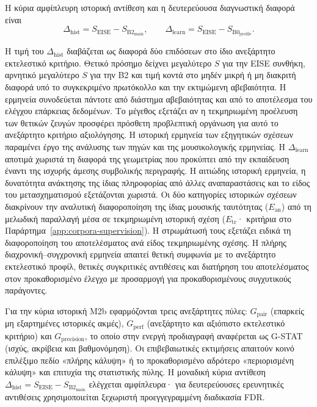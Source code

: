 \documentclass[11pt,a4paper]{article}
\begin{document}
Η κύρια αμφίπλευρη ιστορική αντίθεση και η δευτερεύουσα διαγνωστική διαφορά είναι
\[
\Delta_{\mathrm{hist}}=S_{\mathrm{EISE}}-S_{\mathrm{B2}_{\mathrm{main}}},
\qquad
\Delta_{\mathrm{learn}}=S_{\mathrm{EISE}}-S_{\mathrm{B0}_{\mathrm{profile}}}.
\]

Η τιμή του $\Delta_{\mathrm{hist}}$ διαβάζεται ως διαφορά δύο επιδόσεων στο ίδιο ανεξάρτητο εκτελεστικό κριτήριο. Θετικό πρόσημο δείχνει μεγαλύτερο $S$ για την EISE συνθήκη, αρνητικό μεγαλύτερο $S$ για την B2 και τιμή κοντά στο μηδέν μικρή ή μη διακριτή διαφορά υπό το συγκεκριμένο πρωτόκολλο και την εκτιμώμενη αβεβαιότητα. Η ερμηνεία συνοδεύεται πάντοτε από διάστημα αβεβαιότητας και από το αποτέλεσμα του ελέγχου επάρκειας δεδομένων. Το μέγεθος εξετάζει αν η τεκμηριωμένη προέλευση των θετικών ζευγών προσφέρει πρόσθετη προβλεπτική οργάνωση για αυτό το ανεξάρτητο κριτήριο αξιολόγησης. Η ιστορική ερμηνεία των εξηγητικών σχέσεων παραμένει έργο της ανάλυσης των πηγών και της μουσικολογικής ερμηνείας.
Η $\Delta_{\mathrm{learn}}$ αποτιμά χωριστά τη διαφορά της γεωμετρίας που προκύπτει από την εκπαίδευση έναντι της ισχυρής άμεσης συμβολικής περιγραφής. Η αιτιώδης ιστορική ερμηνεία, η δυνατότητα ανάκτησης της ίδιας πληροφορίας από άλλες αναπαραστάσεις και το είδος του μετασχηματισμού εξετάζονται χωριστά. Οι δύο κατηγορίες ιστορικών σχέσεων διακρίνουν την αναλυτική διαφοροποίηση της ίδιας μουσικής ταυτότητας ($E_{\mathrm{an}}$) από τη μελωδική παραλλαγή μέσα σε τεκμηριωμένη ιστορική σχέση ($E_{\mathrm{tr}}$· κριτήρια στο Παράρτημα~\ref{app:corpora-supervision}). Η στρωμάτωσή τους εξετάζει ειδικά τη διαφοροποίηση του αποτελέσματος ανά είδος τεκμηριωμένης σχέσης. Η πλήρης διαχρονική--συγχρονική ερμηνεία απαιτεί θετική συμφωνία με το ανεξάρτητο εκτελεστικό προφίλ, θετικές συγκριτικές αντιθέσεις και διατήρηση του αποτελέσματος στον προκαθορισμένο έλεγχο με προσαρμογή για προκαθορισμένους συγχυτικούς παράγοντες.

Για την κύρια ιστορική Μ2b εφαρμόζονται τρεις ανεξάρτητες πύλες: $G_{\mathrm{pair}}$ (επαρκείς μη εξαρτημένες ιστορικές ακμές), $G_{\mathrm{perf}}$ (ανεξάρτητο και αξιόπιστο εκτελεστικό κριτήριο) και $G_{\mathrm{precision}}$, το οποίο στην ενεργή προδιαγραφή αναφέρεται ως G-STAT (ισχύς, ακρίβεια και βαθμονόμηση). Οι επιβεβαιωτικές εκτιμήσεις απαιτούν κοινό επιλέξιμο πεδίο «πλήρης κάλυψη» ή το προκαθορισμένο αδρότερο «περιορισμένη κάλυψη» και επιτυχία της στατιστικής πύλης. Η μοναδική κύρια αντίθεση $\Delta_{\mathrm{hist}}=S_{\mathrm{EISE}}-S_{\mathrm{B2}_{\mathrm{main}}}$ ελέγχεται αμφίπλευρα· για δευτερεύουσες ερευνητικές αντιθέσεις χρησιμοποιείται ξεχωριστή προεγγεγραμμένη διαδικασία FDR.
\end{document}

